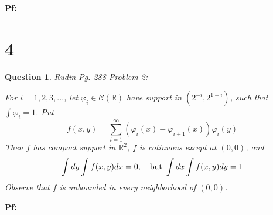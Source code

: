 \documentclass{article}
\newtheorem{question}{Question}
\begin{document}
\textbf{Pf:}



\break

\section*{4}
\begin{myBox}[]{}
    \begin{question}
        Rudin Pg. 288 Problem 2:

        For $i=1,2,3,...$, let $\varphi_i\in \mathcal{C}(\mathbb{R})$ have support in $(2^{-i},2^{1-i})$, such that $\int\varphi_i=1$. Put 
        $$f(x,y)=\sum_{i=1}^{\infty}(\varphi_i(x)-\varphi_{i+1}(x))\varphi_i(y)$$
        Then $f$ has compact support in $\mathbb{R}^2$, $f$ is cotinuous except at $(0,0)$, and 
        $$\int dy\int f(x,y)dx = 0,\quad \textmd{but } \int dx\int f(x,y)dy = 1$$
        Observe that $f$ is unbounded in every neighborhood of $(0,0)$.
    \end{question}
\end{myBox}

\textbf{Pf:}
\end{document}
